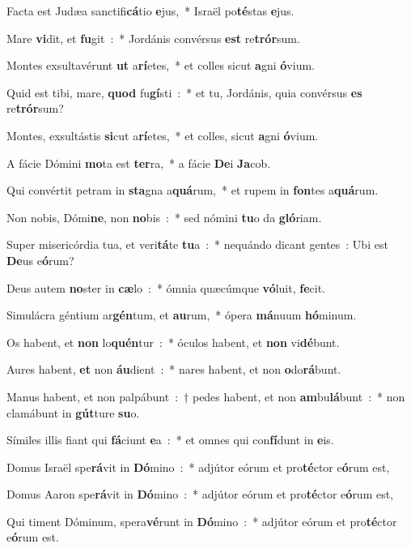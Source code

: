 ﻿\item Facta est Judæa sanctifi\textbf{cá}tio \textbf{e}jus,~* Israël po\textbf{té}stas \textbf{e}jus.
\item Mare \textbf{vi}dit, et \textbf{fu}git~:~* Jordánis convérsus \textbf{est} re\-\textbf{trór}\-sum.
\item Montes exsultavérunt \textbf{ut} a\textbf{rí}etes,~* et colles sicut \textbf{a}gni \textbf{ó}\-vi\-um.
\item Quid est tibi, mare, \textbf{quod} fu\textbf{gí}sti~:~* et tu, Jordánis, quia convérsus \textbf{es} re\textbf{trór}sum?
\item Montes, exsultástis \textbf{si}cut a\textbf{rí}etes,~* et colles, sicut \textbf{a}gni \textbf{ó}\-vi\-um.
\item A fácie Dómini \textbf{mo}ta est \textbf{ter}ra,~* a fácie \textbf{De}i \textbf{Ja}cob.
\item Qui convértit petram in \textbf{sta}gna a\textbf{quá}rum,~* et rupem in \textbf{fon}tes a\textbf{quá}rum.
\item Non nobis, Dómi\textbf{ne}, non \textbf{no}bis~:~* sed nómini \textbf{tu}o da \textbf{gló}riam.
\item Super misericórdia tua, et veri\textbf{tá}te \textbf{tu}a~:~* nequándo dicant gentes~: Ubi est \textbf{De}us e\textbf{ó}rum?
\item Deus autem \textbf{no}ster in \textbf{cæ}lo~:~* ómnia quæcúmque \textbf{vó}\-lu\-it, \textbf{fe}cit.
\item Simulácra géntium ar\textbf{gén}tum, et \textbf{au}rum,~* ópera \textbf{má}\-nu\-um \textbf{hó}minum.
\item Os habent, et \textbf{non} lo\textbf{quén}tur~:~* óculos habent, et \textbf{non} vi\textbf{dé}bunt.
\item Aures habent, \textbf{et} non \textbf{áu}dient~:~* nares habent, et non \textbf{o}do\textbf{rá}bunt.
\item Manus habent, et non palpábunt~:~† pedes habent, et non \textbf{am}bu\textbf{lá}bunt~:~* non clamábunt in \textbf{gút}ture \textbf{su}o.
\item Símiles illis fiant qui \textbf{fá}ciunt \textbf{e}a~:~* et omnes qui con\-\textbf{fí}\-dunt in \textbf{e}is.
\item Domus Israël spe\textbf{rá}vit in \textbf{Dó}mino~:~* adjútor eórum et pro\textbf{té}ctor e\textbf{ó}rum est,
\item Domus Aaron spe\textbf{rá}vit in \textbf{Dó}mino~:~* adjútor eórum et pro\textbf{té}ctor e\textbf{ó}rum est,
\item Qui timent Dóminum, spera\textbf{vé}runt in \textbf{Dó}mino~:~* adjútor eórum et pro\textbf{té}ctor e\textbf{ó}rum est.
